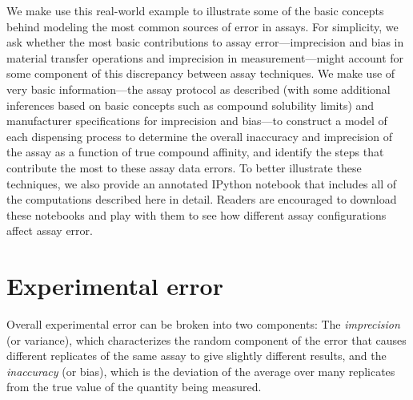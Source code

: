\documentclass[aps,pre,twocolumn,nofootinbib,superscriptaddress,linenumbers]{revtex4-1}
\begin{document}
We make use this real-world example to illustrate some of the basic concepts behind modeling the most common sources of error in assays.
For simplicity, we ask whether the most basic contributions to assay error---imprecision and bias in material transfer operations and imprecision in measurement---might account for some component of this discrepancy between assay techniques.
We make use of very basic information---the assay protocol as described (with some additional inferences based on basic concepts such as compound solubility limits) and manufacturer specifications for imprecision and bias---to construct a model of each dispensing process to determine the overall inaccuracy and imprecision of the assay as a function of true compound affinity, and identify the steps that contribute the most to these assay data errors.
To better illustrate these techniques, we also provide an annotated IPython notebook that includes all of the computations described here in detail.
Readers are encouraged to download these notebooks and play with them to see how different assay configurations affect assay error.

\section{Experimental error}

Overall experimental error can be broken into two components: The \emph{imprecision} (or variance), which characterizes the random component of the error that causes different replicates of the same assay to give slightly different results, and the \emph{inaccuracy} (or bias), which is the deviation of the average over many replicates from the true value of the quantity being measured.

%
\end{document}
